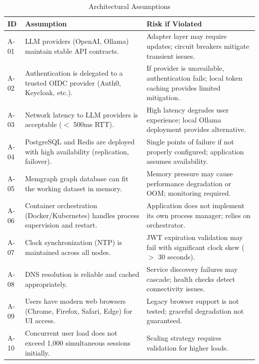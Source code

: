 \begin{table}[htbp]
\centering
\caption{Architectural Assumptions}
\label{tab:assumptions}
\small
\begin{tabularx}{\textwidth}{|>{\raggedright\arraybackslash}p{1.2cm}|>{\raggedright\arraybackslash}X|>{\raggedright\arraybackslash}X|}
\hline
\textbf{ID} & \textbf{Assumption} & \textbf{Risk if Violated} \\
\hline
A-01 & LLM providers (OpenAI, Ollama) maintain stable API contracts. & Adapter layer may require updates; circuit breakers mitigate transient issues. \\
\hline
A-02 & Authentication is delegated to a trusted OIDC provider (Auth0, Keycloak, etc.). & If provider is unavailable, authentication fails; local token caching provides limited mitigation. \\
\hline
A-03 & Network latency to LLM providers is acceptable ($<$ 500ms RTT). & High latency degrades user experience; local Ollama deployment provides alternative. \\
\hline
A-04 & PostgreSQL and Redis are deployed with high availability (replication, failover). & Single points of failure if not properly configured; application assumes availability. \\
\hline
A-05 & Memgraph graph database can fit the working dataset in memory. & Memory pressure may cause performance degradation or OOM; monitoring required. \\
\hline
A-06 & Container orchestration (Docker/Kubernetes) handles process supervision and restart. & Application does not implement its own process manager; relies on orchestrator. \\
\hline
A-07 & Clock synchronization (NTP) is maintained across all nodes. & JWT expiration validation may fail with significant clock skew ($>$ 30 seconds). \\
\hline
A-08 & DNS resolution is reliable and cached appropriately. & Service discovery failures may cascade; health checks detect connectivity issues. \\
\hline
A-09 & Users have modern web browsers (Chrome, Firefox, Safari, Edge) for UI access. & Legacy browser support is not tested; graceful degradation not guaranteed. \\
\hline
A-10 & Concurrent user load does not exceed 1,000 simultaneous sessions initially. & Scaling strategy requires validation for higher loads. \\
\hline
\end{tabularx}
\end{table}

